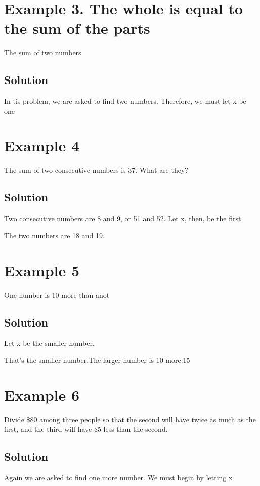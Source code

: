 \documentclass[12pt]{article}%
\begin{document}
\section{Example 3. The whole is equal to the sum of the parts}

The sum of two numbers

\subsection{Solution}
In tis problem, we are asked to find two numbers. Therefore, we must let x be one
    
\section{Example 4}     

The sum of two consecutive numbers is 37. What are they?

\subsection{Solution}

Two consecutive numbers are 8 and 9, or 51 and 52. Let x, then, be the first  


The two numbers are 18 and 19. 

\section{Example 5}

One number is 10 more than anot

\subsection{Solution}

Let x be the smaller number.



That's the smaller number.The larger number is 10 more:15 

\section{Example 6} 

Divide \$80 among three people so that the second will have twice as much as the first, and the third will have \$5 less than the second.

\subsection{Solution}

Again we are asked to find one more number. We must begin by letting x
  
  
 
\end{document}

